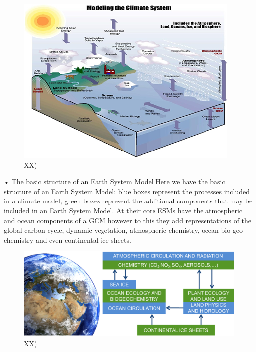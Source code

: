 \documentclass[12pt,oneside]{book}
\begin{document}
\begin{figure}

{\centering \includegraphics[width=0.8\linewidth]{figures/Figure712} 

}

\caption{XX)}\label{fig:Earthsystemmodels}
\end{figure}

• The basic structure of an Earth System Model Here we have the basic
structure of an Earth System Model: blue boxes represent the processes
included in a climate model; green boxes represent the additional
components that may be included in an Earth System Model. At their core
ESMs have the atmospheric and ocean components of a GCM however to this
they add representations of the global carbon cycle, dynamic vegetation,
atmospheric chemistry, ocean bio-geo-chemistry and even continental ice
sheets.

\begin{figure}

{\centering \includegraphics[width=0.8\linewidth]{figures/Figure713} 

}

\caption{XX)}\label{fig:Earthsystemmodels2}
\end{figure}
\end{document}
